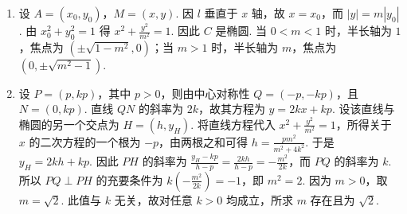 \begin{solution}
\begin{enumerate}
\item 设 \(A=(x_0,y_0)\)，\(M=(x,y)\). 因 \(l\) 垂直于 \(x\) 轴，故 \(x=x_0\)，而 \(|y|=m|y_0|\). 由 \(x_0^2+y_0^2=1\) 得 \(x^2+\frac{y^2}{m^2}=1\). 因此 \(C\) 是椭圆. 当 \(0<m<1\) 时，半长轴为 \(1\)，焦点为 \(\left(\pm\sqrt{1-m^2},0\right)\)；当 \(m>1\) 时，半长轴为 \(m\)，焦点为 \(\left(0,\pm\sqrt{m^2-1}\right)\).
\item 设 \(P=(p,kp)\)，其中 \(p>0\)，则由中心对称性 \(Q=(-p,-kp)\)，且 \(N=(0,kp)\). 直线 \(QN\) 的斜率为 \(2k\)，故其方程为 \(y=2kx+kp\). 设该直线与椭圆的另一个交点为 \(H=(h,y_H)\). 将直线方程代入 \(x^2+\frac{y^2}{m^2}=1\)，所得关于 \(x\) 的二次方程的一个根为 \(-p\)，由两根之和可得 \(h=\frac{pm^2}{m^2+4k^2}\). 于是 \(y_H=2kh+kp\). 因此 \(PH\) 的斜率为 \(\displaystyle\frac{y_H-kp}{h-p}=\frac{2kh}{h-p}=-\frac{m^2}{2k}\)，而 \(PQ\) 的斜率为 \(k\). 所以 \(PQ\perp PH\) 的充要条件为 \(k\left(-\frac{m^2}{2k}\right)=-1\)，即 \(m^2=2\). 因为 \(m>0\)，取 \(m=\sqrt2\). 此值与 \(k\) 无关，故对任意 \(k>0\) 均成立，所求 \(m\) 存在且为 \(\sqrt2\).
\end{enumerate}
\end{solution}
